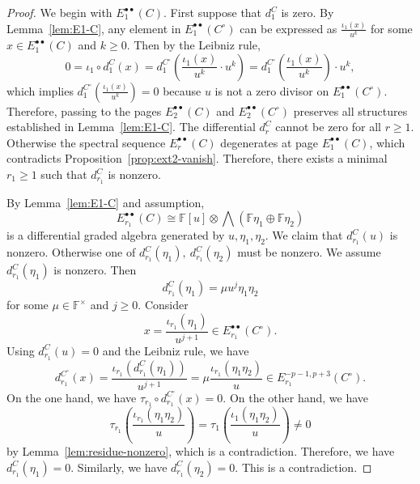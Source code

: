 \documentclass[11pt,a4paper]{article} %
\def\FF{\mathbb{F}}
\begin{document}
\begin{proof}
    We begin with $E_1^{\bullet\bullet}(C)$. First suppose that $d_1^C$ is zero. By Lemma~\ref{lem:E1-C}, any element in $E_1^{\bullet\bullet}(C^\circ)$ can be expressed as $\frac{\iota_1(x)}{u^k}$ for some $x\in E_1^{\bullet\bullet}(C)$ and $k\ge0$. Then by the Leibniz rule,
    \[
    0=\iota_1\circ d_1^{C}(x)=d_1^{C^\circ}(\frac{\iota_1(x)}{u^k}\cdot u^k)=d_1^{C^\circ}(\frac{\iota_1(x)}{u^k})\cdot u^k,
    \]
    which implies $d_1^{C^\circ}(\frac{\iota_1(x)}{u^k})=0$ because $u$ is not a zero divisor on $E_1^{\bullet\bullet}(C^\circ)$. Therefore, passing to the pages $E_2^{\bullet\bullet}(C)$ and $E_2^{\bullet\bullet}(C^\circ)$ preserves all structures established in Lemma~\ref{lem:E1-C}. The differential $d_r^C$ cannot be zero for all $r\ge1$. Otherwise the spectral sequence $E_r^{\bullet\bullet}(C)$ degenerates at page $E_1^{\bullet\bullet}(C)$, which contradicts Proposition~\ref{prop:ext2-vanish}. Therefore, there exists a minimal $r_1\ge1$ such that $d_{r_1}^C$ is nonzero.

    By Lemma~\ref{lem:E1-C} and assumption, 
    \[ 
    E_{r_1}^{\bullet\bullet}(C)\cong\FF[u]\otimes\bigwedge(\FF\eta_1\oplus\FF\eta_2)
    \]
    is a differential graded algebra generated by $u,\eta_1,\eta_2$. We claim that $d_{r_1}^C(u)$ is nonzero. Otherwise one of $d_{r_1}^C(\eta_1),~d_{r_1}^C(\eta_2)$ must be nonzero. We assume $d_{r_1}^C(\eta_1)$ is nonzero. Then 
    \[
    d_{r_1}^C(\eta_1)=\mu u^j\eta_1\eta_2
    \]
    for some $\mu\in\FF^\times$ and $j\ge0$. Consider 
    \[
    x=\frac{\iota_{r_1}(\eta_1)}{u^{j+1}}\in E_{r_1}^{\bullet\bullet}(C^\circ).
    \]
    Using $d_{r_1}^C(u)=0$ and the Leibniz rule, we have
    \[
    d_{r_1}^{C^\circ}(x)=\frac{\iota_{r_1}\left(d_{r_1}^C(\eta_1)\right)}{u^{j+1}}=\mu\frac{\iota_{r_1}(\eta_1\eta_2)}{u}\in E_{r_1}^{-p-1,p+3}(C^\circ).
    \]
    On the one hand, we have $\tau_{r_1}\circ d_{r_1}^{C^\circ}(x)=0$. On the other hand, we have
    \[
    \tau_{r_1}(\frac{\iota_{r_1}(\eta_1\eta_2)}{u})=\tau_1(\frac{\iota_1(\eta_1\eta_2)}{u})\ne0
    \]
    by Lemma~\ref{lem:residue-nonzero}, which is a contradiction. Therefore, we have $d_{r_1}^C(\eta_1)=0$. Similarly, we have $d_{r_1}^C(\eta_2)=0$. This is a contradiction.


\end{proof}
\end{document}
